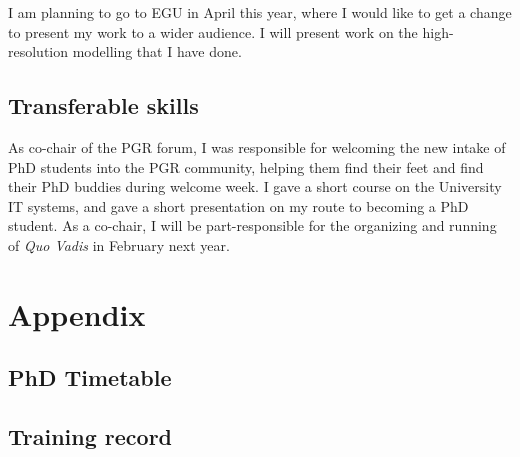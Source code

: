 \documentclass[11pt,a4paper]{article}
\begin{document}
I am planning to go to EGU in April this year, where I would like to get a change to present my work to a wider audience. I will present work on the high-resolution modelling that I have done.

\subsection{Transferable skills}
\label{sec:Transferable skills}
As co-chair of the PGR forum, I was responsible for welcoming the new intake of PhD students into the PGR community, helping them find their feet and find their PhD buddies during welcome week. I gave a short course on the University IT systems, and gave a short presentation on my route to becoming a PhD student. As a co-chair, I will be part-responsible for the organizing and running of \textit{Quo Vadis} in February next year.

\printbibliography[title={References}]

\newpage
\section*{Appendix}

\renewcommand\thefigure{A.\arabic{figure}}
\setcounter{figure}{0}    
\subsection*{PhD Timetable}

\begin{figure}[htp!]
    
\end{figure}

%

\subsection*{Training record}
\end{document}
